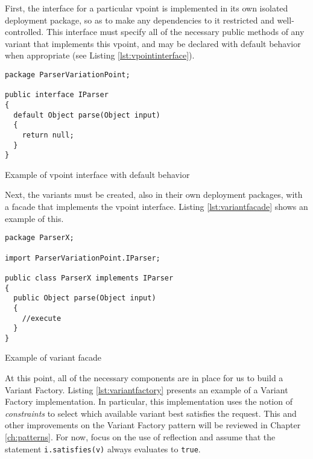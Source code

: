 First, the interface for a particular \gls{vpoint} is implemented in its own isolated deployment package, so as to make any dependencies to it restricted and well-controlled. This interface must specify all of the necessary public methods of any \gls{variant} that implements this \gls{vpoint}, and may be declared with default behavior when appropriate (see Listing \ref{lst:vpointinterface}).

\begin{listing}
\begin{verbatim}
package ParserVariationPoint;

public interface IParser
{
  default Object parse(Object input)
  {
    return null;
  }
}
\end{verbatim}
\caption{Example of \gls{vpoint} interface with default behavior} \label{lst:vpointinterface}
\end{listing}

Next, the \gls{variant}s must be created, also in their own deployment packages, with a facade that implements the \gls{vpoint} interface. Listing \ref{lst:variantfacade} shows an example of this.

\begin{listing}
\begin{verbatim}
package ParserX;

import ParserVariationPoint.IParser;

public class ParserX implements IParser
{
  public Object parse(Object input)
  {
    //execute
  }
}
\end{verbatim}
\caption{Example of \gls{variant} facade} \label{lst:variantfacade}
\end{listing}

At this point, all of the necessary components are in place for us to build a Variant Factory. Listing \ref{lst:variantfactory} presents an example of a Variant Factory implementation. In particular, this implementation uses the notion of \emph{constraints} to select which available \gls{variant} best satisfies the request. This and other improvements on the Variant Factory pattern will be reviewed in Chapter \ref{ch:patterns}. For now, focus on the use of reflection and assume that the statement \lstinline{i.satisfies(v)} always evaluates to \lstinline{true}.

